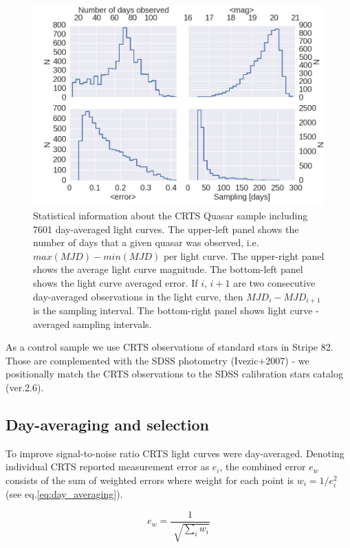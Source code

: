 \documentclass[a4paper,fleqn,usenatbib]{mnras}
\begin{document}
\begin{figure}
\label{fig:CRTS_QSO_stats}
 \includegraphics[width=\columnwidth]{Fig_1_Stats_CRTS_QSO_used.png}
 \caption{Statistical information about the CRTS Quasar sample including 7601 day-averaged light curves. The upper-left panel shows the number of days that a given quasar was observed, i.e. $max(MJD)-min(MJD)$ per light curve. The upper-right panel shows the average light curve magnitude. The bottom-left panel shows the light curve averaged error. If $i$, $i+1$ are two consecutive day-averaged observations in the light curve, then $MJD_{i} - MJD_{i+1}$ is the sampling interval. The bottom-right panel shows light curve - averaged sampling intervals.}
\end{figure}

As a control sample we use CRTS observations of standard stars in Stripe 82. Those are  complemented with the SDSS photometry (Ivezic+2007) - we positionally  match the CRTS observations to the SDSS calibration stars catalog (ver.2.6). 


\subsection{Day-averaging and selection}
\label{sec:sample_sel}


To improve signal-to-noise ratio CRTS light curves were day-averaged.  Denoting individual CRTS reported measurement error as $e_{i}$, the combined error $e_{w}$ consists of the sum of weighted errors where weight for each point is $ w_{i} = 1 / e_{i}^{2}$ (see eq.\ref{eq:day_averaging}). 


\begin{equation}
\label{eq:day_averaging}
 e_{w} = \frac{1}{\sqrt[]{\sum_{i} w_{i}}}
\end{equation}
\end{document}
